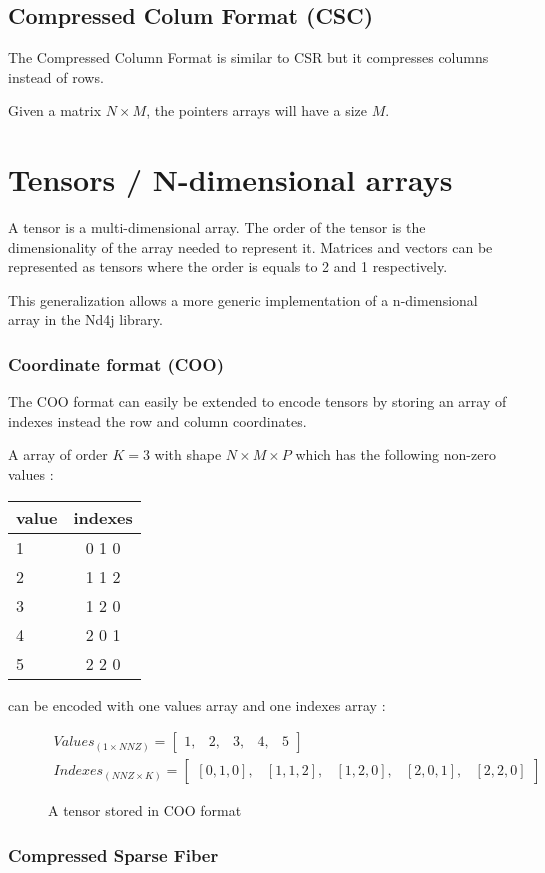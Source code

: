 \subsection{Compressed Colum Format (CSC)}
The Compressed Column Format is similar to {CSR} but it compresses columns instead of rows.

Given a matrix $N\times M$, the pointers arrays will have a size $M$. 
\section{Tensors / N-dimensional arrays}

A tensor is a multi-dimensional array. The order of the tensor is the dimensionality of the array needed to represent it. Matrices and vectors can be represented as tensors where the order is equals to 2 and 1 respectively.

This generalization allows a more generic implementation of a n-dimensional array in the Nd4j library.

\subsubsection{Coordinate format (COO)}
The COO format can easily be extended to encode tensors by storing an array of indexes instead the row and column coordinates. 

A array of order $K = 3$ with shape $N\times M \times P$ which has the following non-zero values :
\begin{center}
	\begin{tabular}{ l | c  }
		value & indexes\\ \hline
		1 & 0 1 0\\ \hline
		2 & 1 1 2 \\ \hline
		3 & 1 2 0 \\ \hline
		4 & 2 0 1 \\ \hline
		5 & 2 2 0 \\ 
		
	\end{tabular}
\end{center}

can be encoded with one values array and one indexes array :
\begin{figure}[h]
\[
\begin{aligned}
Values_{(1\times NNZ)} = 
\begin{bmatrix}
1, &  2, & 3, & 4, & 5
\end{bmatrix}
\\
Indexes_{(NNZ \times K)} = 
\begin{bmatrix}
[0, 1, 0] ,&  [1, 1, 2], & [1, 2, 0], & [2, 0, 1], & [2, 2, 0]
\end{bmatrix}
\end{aligned}
\]
\caption{A tensor stored in COO format}
\end{figure}
\subsubsection{Compressed Sparse Fiber}